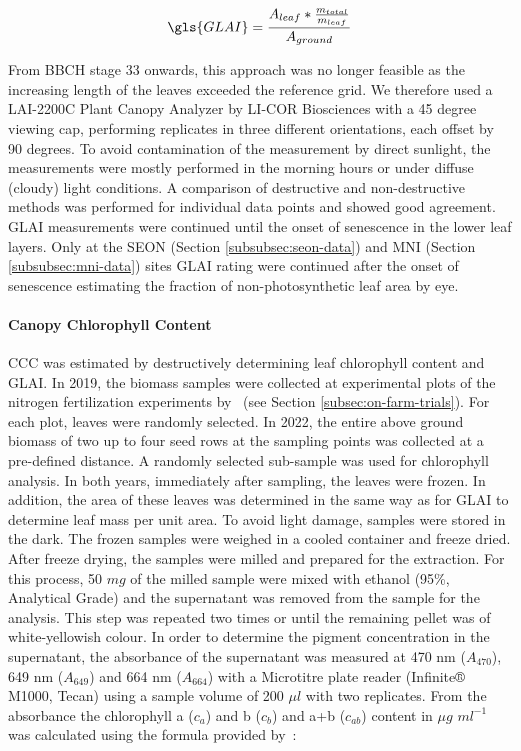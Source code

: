 \begin{equation}
    \label{eq:destructive-glai}
    \gls{GLAI} = \frac{A_{leaf} * \frac{m_{total}}{m_{leaf}}}{A_{ground}}
\end{equation}

From BBCH stage 33 onwards, this approach was no longer feasible as the increasing length of the leaves exceeded the reference grid. We therefore used a LAI-2200C Plant Canopy Analyzer by LI-COR Biosciences with a 45 degree viewing cap, performing replicates in three different orientations, each offset by 90 degrees. To avoid contamination of the measurement by direct sunlight, the measurements were mostly performed in the morning hours or under diffuse (cloudy) light conditions. A comparison of destructive and non-destructive methods was performed for individual data points and showed good agreement. \gls{GLAI} measurements were continued until the onset of senescence in the lower leaf layers. Only at the SEON (Section \ref{subsubsec:seon-data}) and MNI (Section \ref{subsubsec:mni-data}) sites \gls{GLAI} rating were continued after the onset of senescence estimating the fraction of non-photosynthetic leaf area by eye.

\paragraph{Canopy Chlorophyll Content}
CCC was estimated by destructively determining leaf chlorophyll content and GLAI. In 2019, the biomass samples were collected at experimental plots of the nitrogen fertilization experiments by~\cite{argento_investigating_2022} (see Section \ref{subsec:on-farm-trials}). For each plot, leaves were randomly selected. In 2022, the entire above ground biomass of two up to four seed rows at the sampling points was collected at a pre-defined distance. A randomly selected sub-sample was used for chlorophyll analysis. In both years, immediately after sampling, the leaves were frozen. In addition, the area of these leaves was determined in the same way as for \gls{GLAI} to determine leaf mass per unit area. To avoid light damage, samples were stored in the dark. The frozen samples were weighed in a cooled container and freeze dried. After freeze drying, the samples were milled and prepared for the extraction. For this process, 50 $mg$ of the milled sample were mixed with ethanol (95\%, Analytical Grade) and the supernatant was removed from the sample for the analysis. This step was repeated two times or until the remaining pellet was of white-yellowish colour. In order to determine the pigment concentration in the supernatant, the absorbance of the supernatant was measured at 470 nm ($A_{470}$), 649 nm ($A_{649}$) and 664 nm ($A_{664}$) with a Microtitre plate reader (Infinite® M1000, Tecan) using a sample volume of 200 $\mu l$ with two replicates. From the absorbance the chlorophyll a ($c_a$) and b ($c_b$) and a+b ($c_{ab}$) content in $\mu g$ $ml^{-1}$ was calculated using the formula provided by~\citet{lichtenthaler_chlorophylls_2001}:


